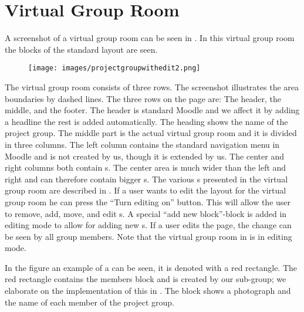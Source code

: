 \section{Virtual Group Room}
\label{sec:prePgrRom}
A screenshot of a virtual group room can be seen in . 
In this virtual group room the blocks of the standard layout are seen.
\begin{figure}[h]
	\centering
		\texttt{[image: images/projectgroupwithedit2.png]}
	\label{fig:projectgroupnoedit}
\end{figure}

The virtual group room consists of three rows.
The screenshot illustrates the area boundaries by dashed lines. 
The three rows on the page are: The header, the middle, and the footer. 
The header is standard Moodle and we affect it by adding a headline the rest is added automatically.
The heading shows the name of the project group. 
The middle part is the actual virtual group room and it is divided in three columns. 
The left column contains the standard navigation menu in Moodle and is not created by us, though it is extended by us.
The center and right columns both contain \block{}s.
The center area is much wider than the left and right and can therefore contain bigger \block{}s. 
The various \block{}s presented in the virtual group room are described in . 
If a user wants to edit the layout for the virtual group room he can press the ``Turn editing on'' button. 
This will allow the user to remove, add, move, and edit \block{}s. 
A special ``add new block''-block is added in editing mode to allow for adding new \block{}s. 
If a user edits the page, the change can be seen by all group members. 
Note that the virtual group room in  is in editing mode.

In the figure an example of a \block{} can be seen, it is denoted with a red rectangle.
The red rectangle contains the members block and is created by our sub-group; we elaborate on the implementation of this in . 
The block shows a photograph and the name of each member of the project group. 



